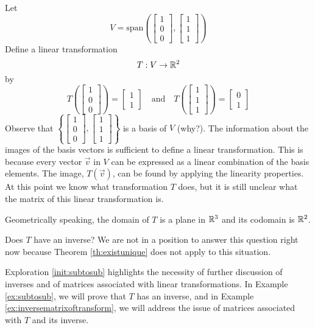 \documentclass{ximera}
\begin{document}
\begin{exploration}\label{init:subtosub}
Let $$V=\text{span}\left(\begin{bmatrix}1\\0\\0\end{bmatrix}, \begin{bmatrix}1\\1\\1\end{bmatrix}\right)$$
Define a linear transformation $$T:V\rightarrow \mathbb{R}^2$$
by $$T\left(\begin{bmatrix}1\\0\\0\end{bmatrix}\right)=\begin{bmatrix}1\\1\end{bmatrix}\quad \text{and} \quad T\left(\begin{bmatrix}1\\1\\1\end{bmatrix}\right)=\begin{bmatrix}0\\1\end{bmatrix}$$
Observe that $\left\{\begin{bmatrix}1\\0\\0\end{bmatrix}, \begin{bmatrix}1\\1\\1\end{bmatrix}\right\}$ is a basis of $V$ (why?). The information about the images of the basis vectors is sufficient to define a linear transformation.  This is because every vector $\vec{v}$ in $V$ can be expressed as a linear combination of the basis elements.  The image, $T(\vec{v})$, can be found by applying the linearity properties.
At this point we know what transformation $T$ does, but it is still unclear what the matrix of this linear transformation is.
 
Geometrically speaking, the domain of $T$ is a plane in $\mathbb{R}^3$ and its codomain is $\mathbb{R}^2$. 
 
Does $T$ have an inverse?  We are not in a position to answer this question right now because Theorem \ref{th:existunique} does not apply to this situation.
\end{exploration}
Exploration \ref{init:subtosub} highlights the necessity of further discussion of inverses and of matrices associated with linear transformations.  In Example \ref{ex:subtosub}, we will prove that $T$ has an inverse, and in Example \ref{ex:inversematrixoftransform}, we will address the issue of matrices associated with $T$ and its inverse.
 
\end{document}
